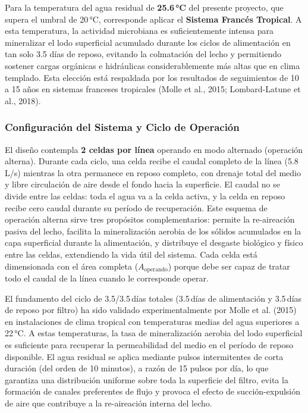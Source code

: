 \documentclass[12pt,a4paper]{article}
\begin{document}
Para la temperatura del agua residual de \textbf{25.6\,°C} del presente proyecto, que supera el umbral de 20\,°C, corresponde aplicar el \textbf{Sistema Francés Tropical}. A esta temperatura, la actividad microbiana es suficientemente intensa para mineralizar el lodo superficial acumulado durante los ciclos de alimentación en tan solo 3.5 días de reposo, evitando la colmatación del lecho y permitiendo sostener cargas orgánicas e hidráulicas considerablemente más altas que en clima templado. Esta elección está respaldada por los resultados de seguimientos de 10 a 15 años en sistemas franceses tropicales (Molle et al., 2015; Lombard-Latune et al., 2018).

\subsubsection*{Configuración del Sistema y Ciclo de Operación}

El diseño contempla \textbf{2 celdas por línea} operando en modo alternado (operación alterna). Durante cada ciclo, una celda recibe el caudal completo de la línea (5.8 L/s) mientras la otra permanece en reposo completo, con drenaje total del medio y libre circulación de aire desde el fondo hacia la superficie. El caudal no se divide entre las celdas: toda el agua va a la celda activa, y la celda en reposo recibe cero caudal durante su período de recuperación. Este esquema de operación alterna sirve tres propósitos complementarios: permite la re-aireación pasiva del lecho, facilita la mineralización aerobia de los sólidos acumulados en la capa superficial durante la alimentación, y distribuye el desgaste biológico y físico entre las celdas, extendiendo la vida útil del sistema. Cada celda está dimensionada con el área completa ($A_\text{operando}$) porque debe ser capaz de tratar todo el caudal de la línea cuando le corresponde operar.

El fundamento del ciclo de 3.5/3.5\,días totales (3.5\,días de alimentación y 3.5\,días de reposo por filtro) ha sido validado experimentalmente por Molle et al. (2015) en instalaciones de clima tropical con temperaturas medias del agua superiores a 22\,°C. A estas temperaturas, la tasa de mineralización aerobia del lodo superficial es suficiente para recuperar la permeabilidad del medio en el período de reposo disponible. El agua residual se aplica mediante pulsos intermitentes de corta duración (del orden de 10 minutos), a razón de 15 pulsos por día, lo que garantiza una distribución uniforme sobre toda la superficie del filtro, evita la formación de canales preferentes de flujo y provoca el efecto de succión-expulsión de aire que contribuye a la re-aireación interna del lecho.
\end{document}
